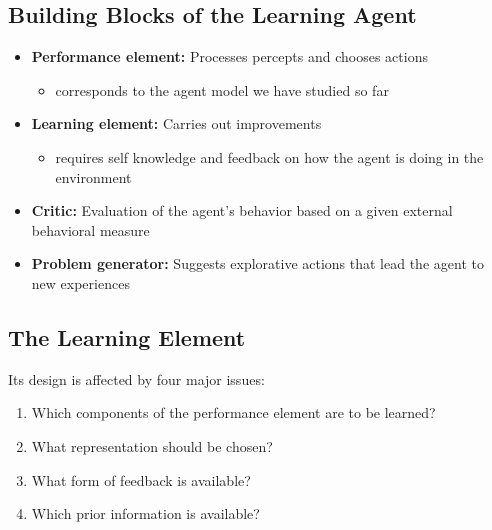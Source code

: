 \documentclass[conference, a4paper]{styles/acmsiggraph}
\begin{document}
    \subsection{Building Blocks of the Learning Agent}
        \begin{itemize}
            \item \textbf{Performance element:} Processes percepts and chooses actions
            \begin{itemize}
                \item corresponds to the agent model we have studied so far
            \end{itemize}
            \item \textbf{Learning element:} Carries out improvements
            \begin{itemize}
                \item requires self knowledge and feedback on how the agent is doing in the environment
            \end{itemize}
            \item \textbf{Critic:} Evaluation of the agent's behavior based on a given external behavioral measure
            \item \textbf{Problem generator:} Suggests explorative actions that lead the agent to new experiences
        \end{itemize}
    
    \subsection{The Learning Element}
        Its design is affected by four major issues:
        \begin{enumerate}
            \item Which components of the performance element are to be learned?
            \item What representation should be chosen?
            \item What form of feedback is available?
            \item Which prior information is available?
        \end{enumerate}
    
\end{document}
